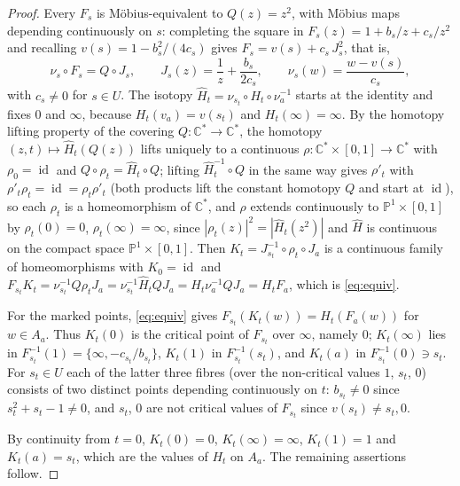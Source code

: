 \documentclass[11pt]{article}
\newcommand{\Pone}{\mathbb P^1}
\newcommand{\C}{\mathbb C}
\newcommand{\id}{\operatorname{id}}
\theoremstyle{remark}
\numberwithin{equation}{section}
\begin{document}
\begin{proof}
Every $F_s$ is M\"obius-equivalent to $Q(z)=z^2$, with M\"obius maps
depending continuously on $s$: completing the square in
$F_s(z)=1+b_s/z+c_s/z^2$ and recalling $v(s)=1-b_s^2/(4c_s)$ gives
$F_s=v(s)+c_s\,J_s^2$, that is,
\[
 \nu_s\circ F_s=Q\circ J_s,\qquad
 J_s(z)=\frac1z+\frac{b_s}{2c_s},\qquad \nu_s(w)=\frac{w-v(s)}{c_s},
\]
with $c_s\ne0$ for $s\in U$. The isotopy
$\widehat H_t=\nu_{s_t}\circ H_t\circ \nu_a^{-1}$ starts at the identity
and fixes $0$ and $\infty$, because $H_t(v_a)=v(s_t)$ and
$H_t(\infty)=\infty$. By the homotopy lifting property of the covering
$Q\colon\C^*\to\C^*$, the homotopy $(z,t)\mapsto\widehat H_t(Q(z))$ lifts
uniquely to a continuous $\rho\colon\C^*\times[0,1]\to\C^*$ with
$\rho_0=\id$ and $Q\circ\rho_t=\widehat H_t\circ Q$; lifting
$\widehat H_t^{-1}\circ Q$ in the same way gives $\rho'_t$ with
$\rho'_t\rho_t=\id=\rho_t\rho'_t$ (both products lift the constant
homotopy $Q$ and start at $\id$), so each $\rho_t$ is a homeomorphism of
$\C^*$, and $\rho$ extends continuously to $\Pone\times[0,1]$ by
$\rho_t(0)=0$, $\rho_t(\infty)=\infty$, since
$|\rho_t(z)|^2=|\widehat H_t(z^2)|$ and $\widehat H$ is continuous on the
compact space $\Pone\times[0,1]$. Then
$K_t=J_{s_t}^{-1}\circ\rho_t\circ J_a$ is a continuous family of
homeomorphisms with $K_0=\id$ and
$F_{s_t}K_t=\nu_{s_t}^{-1}Q\rho_tJ_a=\nu_{s_t}^{-1}\widehat H_tQJ_a
=H_t\nu_a^{-1}QJ_a=H_tF_a$, which is \eqref{eq:equiv}.

For the marked points, \eqref{eq:equiv} gives
$F_{s_t}(K_t(w))=H_t(F_a(w))$ for $w\in A_a$. Thus $K_t(0)$ is the critical
point of $F_{s_t}$ over $\infty$, namely $0$; $K_t(\infty)$ lies in
$F_{s_t}^{-1}(1)=\{\infty,-c_{s_t}/b_{s_t}\}$, $K_t(1)$ in
$F_{s_t}^{-1}(s_t)$, and $K_t(a)$ in $F_{s_t}^{-1}(0)\ni s_t$. For $s_t\in U$ each of the latter three fibres
(over the non-critical values $1$, $s_t$, $0$) consists of
two distinct points depending continuously on $t$: $b_{s_t}\ne0$ since
$s_t^2+s_t-1\ne0$, and $s_t$, $0$ are not critical values of $F_{s_t}$
since $v(s_t)\ne s_t,0$. 

By continuity from $t=0$,
$K_t(0)=0$, $K_t(\infty)=\infty$, $K_t(1)=1$ and $K_t(a)=s_t$, which are
the values of $H_t$ on $A_a$. The remaining assertions follow.
\end{proof}
\end{document}
